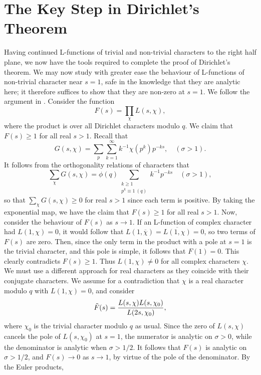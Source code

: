 \section{The Key Step in Dirichlet's Theorem}
Having continued L-functions of trivial and non-trivial characters to the right half plane, we now have the tools required to complete the proof of Dirichlet's theorem. We may now study with greater ease the behaviour of L-functions of non-trivial character near $s = 1$, safe in the knowledge that they are analytic here; it therefore suffices to show that they are non-zero at $s = 1$. We follow the argument in \cite{ireland_rosen_1990}. Consider the function
\begin{equation}
    F(s) = \prod_{\chi} L(s, \chi), \nonumber
\end{equation}
where the product is over all Dirichlet characters modulo $q$. We claim that $F(s) \geq 1$ for all real $s > 1$. Recall that 
\begin{equation}
    G(s, \chi) = \sum_{p} \sum_{k=1}^{\infty} k^{-1} \chi(p^{k}) p^{-ks}, \quad (\sigma > 1). \nonumber
\end{equation}
It follows from the orthogonality relations of characters that
\begin{equation}
    \sum_{\chi} G(s, \chi) = \phi(q) \sum_{\substack{k \geq 1 \\ p^{k} \equiv 1 \ (q)}} k^{-1} p^{-ks} \quad (\sigma > 1), \nonumber
\end{equation}
so that $\sum_{\chi}G(s, \chi) \geq 0$ for real $s > 1$ since each term is positive. By taking the exponential map, we have the claim that $F(s) \geq 1$ for all real $s > 1$. Now, consider the behaviour of $F(s)$ as $s \rightarrow 1$. If an L-function of complex character had $L(1, \chi) = 0$, it would follow that $L(1, \overline{\chi}) = \overline{L(1, \chi)} = 0$, so two terms of $F(s)$ are zero. Then, since the only term in the product with a pole at $s = 1$ is the trivial character, and this pole is simple, it follows that $F(1) = 0$. This clearly contradicts $F(s) \geq 1$. Thus $L(1, \chi) \neq 0$ for all complex characters $\chi$. We must use a different approach for real characters as they coincide with their conjugate characters. We assume for a contradiction that $\chi$ is a real character modulo $q$ with $L(1, \chi) = 0$, and consider
\begin{equation}
    \Tilde{F}(s) = \frac{L(s, \chi) L(s, \chi_0)}{L(2s, \chi_0)}, \nonumber
\end{equation}
where $\chi_0$ is the trivial character modulo $q$ as usual. Since the zero of $L(s, \chi)$ cancels the pole of $L(s, \chi_0)$ at $s=1$, the numerator is analytic on $\sigma > 0$, while the denominator is analytic when $\sigma > 1/2$. It follows that $F(s)$ is analytic on $\sigma > 1/2$, and $F(s) \rightarrow 0$ as $s \rightarrow 1$, by virtue of the pole of the denominator. By the Euler products,
